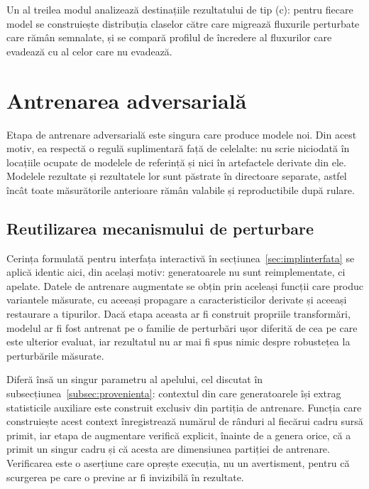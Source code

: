 Un al treilea modul analizează destinațiile rezultatului de tip (c): pentru fiecare model se construiește distribuția claselor către care migrează fluxurile perturbate care rămân semnalate, și se compară profilul de încredere al fluxurilor care evadează cu al celor care nu evadează.

\section{Antrenarea adversarială}\label{sec:impladversarial}

Etapa de antrenare adversarială este singura care produce modele noi. Din acest motiv, ea respectă o regulă suplimentară față de celelalte: nu scrie niciodată în locațiile ocupate de modelele de referință și nici în artefactele derivate din ele. Modelele rezultate și rezultatele lor sunt păstrate în directoare separate, astfel încât toate măsurătorile anterioare rămân valabile și reproductibile după rulare.

\subsection{Reutilizarea mecanismului de perturbare}\label{subsec:reutilizare}

Cerința formulată pentru interfața interactivă în secțiunea~\ref{sec:implinterfata} se aplică identic aici, din același motiv: generatoarele nu sunt reimplementate, ci apelate. Datele de antrenare augmentate se obțin prin aceleași funcții care produc variantele măsurate, cu aceeași propagare a caracteristicilor derivate și aceeași restaurare a tipurilor. Dacă etapa aceasta ar fi construit propriile transformări, modelul ar fi fost antrenat pe o familie de perturbări ușor diferită de cea pe care este ulterior evaluat, iar rezultatul nu ar mai fi spus nimic despre robustețea la perturbările măsurate.

Diferă însă un singur parametru al apelului, cel discutat în subsecțiunea~\ref{subsec:provenienta}: contextul din care generatoarele își extrag statisticile auxiliare este construit exclusiv din partiția de antrenare. Funcția care construiește acest context înregistrează numărul de rânduri al fiecărui cadru sursă primit, iar etapa de augmentare verifică explicit, înainte de a genera orice, că a primit un singur cadru și că acesta are dimensiunea partiției de antrenare. Verificarea este o aserțiune care oprește execuția, nu un avertisment, pentru că scurgerea pe care o previne ar fi invizibilă în rezultate.


